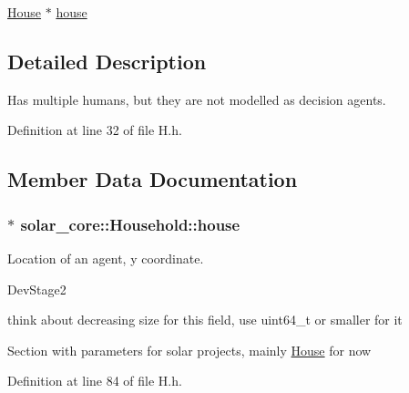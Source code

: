{\bf }\par
\begin{DoxyCompactItemize}
\item 
\hyperlink{class_house}{House} $\ast$ \hyperlink{classsolar__core_1_1_household_a1104d8264fe733937e1fd2e9ad0f8fc1}{house}
\end{DoxyCompactItemize}



\subsection{Detailed Description}
Has multiple humans, but they are not modelled as decision agents. 

Definition at line 32 of file H.\+h.



\subsection{Member Data Documentation}
\hypertarget{classsolar__core_1_1_household_a1104d8264fe733937e1fd2e9ad0f8fc1}{}
\subsubsection[{house}]{$\ast$ solar\+\_\+core\+::\+Household\+::house\hspace{0.3cm}{\ttfamily [protected]}}\label{classsolar__core_1_1_household_a1104d8264fe733937e1fd2e9ad0f8fc1}
Location of an agent, y coordinate.\begin{DoxyRefDesc}{Dev\+Stage2}
\item[\hyperlink{_dev_stage2__DevStage2000002}{Dev\+Stage2}]think about decreasing size for this field, use uint64\+\_\+t or smaller for it \end{DoxyRefDesc}


Section with parameters for solar projects, mainly \hyperlink{class_house}{House} for now 

Definition at line 84 of file H.\+h.

\hypertarget{classsolar__core_1_1_household_a6596375631a366fdd24270f75548841f}{}
